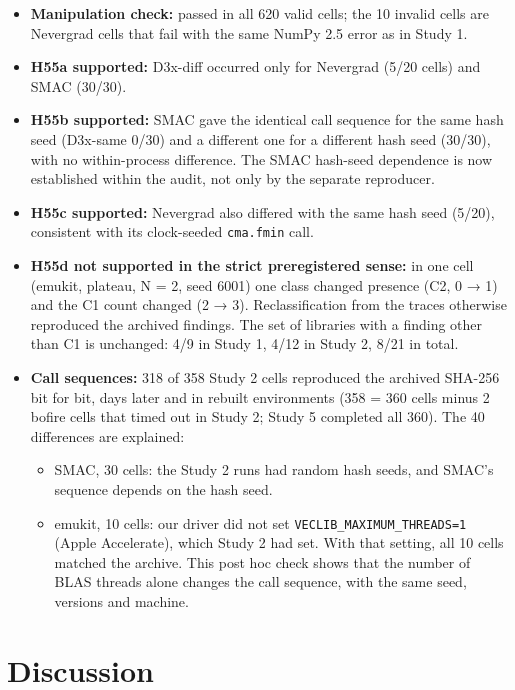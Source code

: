 \documentclass[acmsmall,screen,review,anonymous=false]{acmart}
\providecommand{\tightlist}{\setlength{\itemsep}{0pt}\setlength{\parskip}{0pt}}
\begin{document}
\begin{itemize}
\tightlist
\item
  \textbf{Manipulation check:} passed in all 620 valid cells; the 10 invalid cells are Nevergrad cells that fail with the
  same NumPy 2.5 error as in Study 1.
\item
  \textbf{H55a supported:} D3x-diff occurred only for Nevergrad (5/20 cells) and SMAC (30/30).
\item
  \textbf{H55b supported:} SMAC gave the identical call sequence for the same hash seed (D3x-same 0/30) and a different
  one for a different hash seed (30/30), with no within-process difference. The SMAC hash-seed dependence is now
  established within the audit, not only by the separate reproducer.
\item
  \textbf{H55c supported:} Nevergrad also differed with the same hash seed (5/20), consistent with its clock-seeded
  \texttt{cma.\allowbreak{}fmin} call.
\item
  \textbf{H55d not supported in the strict preregistered sense:} in one cell (emukit, plateau, N = 2, seed 6001) one class
  changed presence (C2, 0 → 1) and the C1 count changed (2 → 3). Reclassification from the traces otherwise reproduced the archived findings. The set of libraries
  with a finding other than C1 is unchanged: 4/9 in Study 1, 4/12 in Study 2, 8/21 in total.
\item
  \textbf{Call sequences:} 318 of 358 Study 2 cells reproduced the archived SHA-256 bit for bit, days later and in
  rebuilt environments (358 = 360 cells minus 2 bofire cells that timed out in Study 2; Study 5 completed all 360). The 40 differences are explained:

  \begin{itemize}
  \tightlist
  \item
    SMAC, 30 cells: the Study 2 runs had random hash seeds, and SMAC's sequence depends on the hash seed.
  \item
    emukit, 10 cells: our driver did not set \texttt{VECLIB\_\allowbreak{}MAXIMUM\_\allowbreak{}THREADS=1} (Apple Accelerate), which Study 2 had set.
    With that setting, all 10 cells matched the archive. This post hoc check shows that the number of BLAS threads
    alone changes the call sequence, with the same seed, versions and machine.
  \end{itemize}
\end{itemize}

\section{Discussion}\label{discussion}
\end{document}
